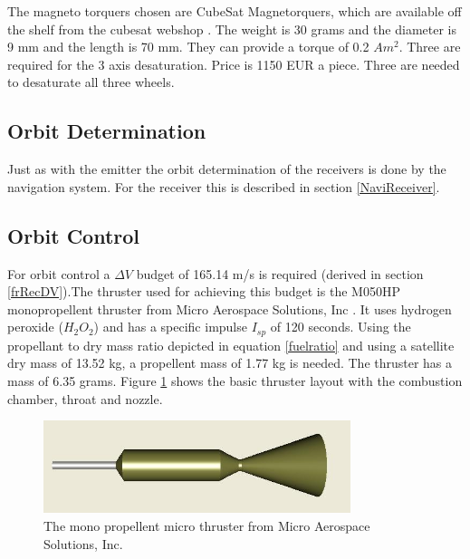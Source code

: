The magneto torquers chosen are CubeSat Magnetorquers, which are available off the shelf from the cubesat webshop \cite{cubesatshop}. The weight is 30 grams and the diameter is 9 mm and the length is 70 mm. They can provide a torque of 0.2 $Am^2$. Three are required for the 3 axis desaturation. Price is 1150 EUR a piece. Three are needed to desaturate all three wheels.

\subsection{Orbit Determination}
\label{ss:recDDods}
Just as with the emitter the orbit determination of the receivers is done by the navigation system. For the receiver this is described in section \ref{NaviReceiver}.

\subsection{Orbit Control}
\label{ss:recDDocs}
For orbit control a $\Delta V$ budget of 165.14 m/s is required (derived in section \ref{frRecDV}).The thruster used for achieving this budget is the M050HP monopropellent thruster from Micro Aerospace Solutions, Inc \cite{h2o2thruster}. It uses hydrogen peroxide ($H_2O_2$) and has a specific impulse $I_{sp}$ of 120 seconds. Using the propellant to dry mass ratio depicted in equation \ref{fuelratio} and using a satellite dry mass of  13.52 kg, a propellent mass of  1.77 kg is needed. The thruster has a mass of 6.35 grams. Figure \ref{fig:microthrust} shows the basic thruster layout with the combustion chamber, throat and nozzle.

\begin{figure} [h]
\centering
\includegraphics[width=0.8\textwidth]{chapters/img/MAS_acsThruster.jpg}
\caption[Micro thruster]{The mono propellent micro thruster from Micro Aerospace Solutions, Inc. \cite{h2o2thruster}}
\label{fig:microthrust}
\end{figure}

